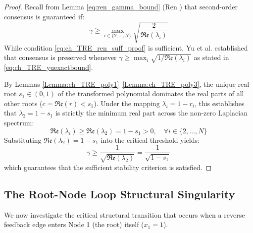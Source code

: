 \begin{proof}
Recall from Lemma \ref{eq:ren_gamma_bound} (Ren \cite{ren2008consensus}) that second-order consensus is guaranteed if:
\begin{equation}\label{eq:ch_TRE_ren_suff_proof}
	\gamma \ge \max_{i \in \{2, \dots, N\}} \sqrt{\frac{2}{\mathfrak{Re}(\lambda_i)}}
\end{equation}
While condition \eqref{eq:ch_TRE_ren_suff_proof} is sufficient, Yu et al. \cite{yu2010some} established that consensus is preserved whenever $\gamma \ge \max_i \sqrt{1/\mathfrak{Re}(\lambda_i)}$ as stated in \eqref{eq:ch_TRE_yuexactbound}. 

By Lemmas \ref{Lemma:ch_TRE_poly1}–\ref{Lemma:ch_TRE_poly3}, the unique real root $s_1 \in (0,1)$ of the transformed polynomial dominates the real parts of all other roots ($c = \mathfrak{Re}(r) < s_1$). Under the mapping $\lambda_i = 1 - r_i$, this establishes that $\lambda_2 = 1 - s_1$ is strictly the minimum real part across the non-zero Laplacian spectrum:
\begin{equation}
	\mathfrak{Re}(\lambda_i) \ge \mathfrak{Re}(\lambda_2) = 1 - s_1 > 0, \quad \forall i \in \{2, \dots, N\}
\end{equation}
Substituting $\mathfrak{Re}(\lambda_2) = 1 - s_1$ into the critical threshold yields:
\begin{equation}\label{eq:ch_TRE_DubeyBound}
	\gamma \ge \frac{1}{\sqrt{\mathfrak{Re}(\lambda_2)}} = \frac{1}{\sqrt{1 - s_1}}
\end{equation}
which guarantees that the sufficient stability criterion is satisfied.
\end{proof}

\subsection{The Root-Node Loop Structural Singularity}

We now investigate the critical structural transition that occurs when a reverse feedback edge enters Node 1 (the root) itself ($x_1 = 1$).

